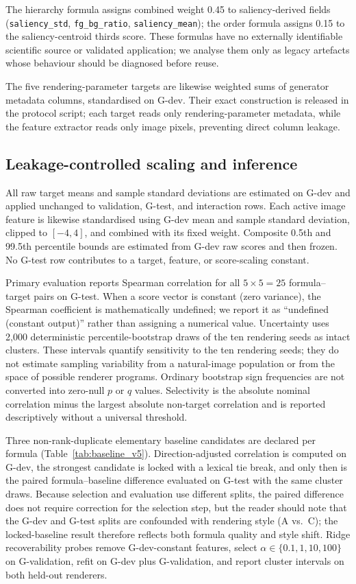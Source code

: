 The hierarchy formula assigns combined weight 0.45 to saliency-derived fields (\texttt{saliency\_std}, \texttt{fg\_bg\_ratio}, \texttt{saliency\_mean}); the order formula assigns 0.15 to the saliency-centroid thirds score. These formulas have no externally identifiable scientific source or validated application; we analyse them only as legacy artefacts whose behaviour should be diagnosed before reuse.

The five rendering-parameter targets are likewise weighted sums of generator metadata columns, standardised on G-dev. Their exact construction is released in the protocol script; each target reads only rendering-parameter metadata, while the feature extractor reads only image pixels, preventing direct column leakage.

\subsection{Leakage-controlled scaling and inference}

All raw target means and sample standard deviations are estimated on G-dev and applied unchanged to validation, G-test, and interaction rows. Each active image feature is likewise standardised using G-dev mean and sample standard deviation, clipped to $[-4,4]$, and combined with its fixed weight. Composite 0.5th and 99.5th percentile bounds are estimated from G-dev raw scores and then frozen. No G-test row contributes to a target, feature, or score-scaling constant.

Primary evaluation reports Spearman correlation for all $5\times5=25$ formula--target pairs on G-test. When a score vector is constant (zero variance), the Spearman coefficient is mathematically undefined; we report it as ``undefined (constant output)'' rather than assigning a numerical value. Uncertainty uses 2,000 deterministic percentile-bootstrap draws of the ten rendering seeds as intact clusters. These intervals quantify sensitivity to the ten rendering seeds; they do not estimate sampling variability from a natural-image population or from the space of possible renderer programs. Ordinary bootstrap sign frequencies are not converted into zero-null $p$ or $q$ values. Selectivity is the absolute nominal correlation minus the largest absolute non-target correlation and is reported descriptively without a universal threshold.

Three non-rank-duplicate elementary baseline candidates are declared per formula (Table~\ref{tab:baseline_v5}). Direction-adjusted correlation is computed on G-dev, the strongest candidate is locked with a lexical tie break, and only then is the paired formula--baseline difference evaluated on G-test with the same cluster draws. Because selection and evaluation use different splits, the paired difference does not require correction for the selection step, but the reader should note that the G-dev and G-test splits are confounded with rendering style (A vs.\ C); the locked-baseline result therefore reflects both formula quality and style shift. Ridge recoverability probes remove G-dev-constant features, select $\alpha\in\{0.1,1,10,100\}$ on G-validation, refit on G-dev plus G-validation, and report cluster intervals on both held-out renderers.
